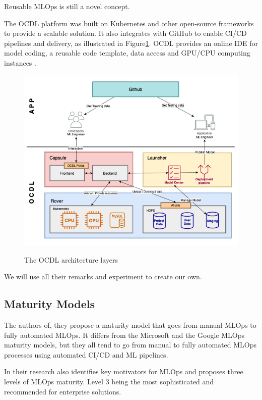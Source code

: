 Reusable MLOps is still a novel concept\cite{10690392}.

The OCDL platform\cite{LIU2020704} was built on Kubernetes and other open-source frameworks to provide a scalable solution.
It also integrates with GitHub to enable CI/CD pipelines and delivery, as illustrated in Figure\ref{fig:ocdl}.
OCDL provides an online IDE for model coding, a reusable code template, data access and GPU/CPU computing instances\cite{LIU2020704} .

\begin{figure}[!htbp]
    \caption{The OCDL architecture layers\cite{LIU2020704}}
    \centering
    \includegraphics[scale=0.5]{images/ocdl-architecture}
    \label{fig:ocdl}
\end{figure}

We will use all their remarks and experiment to create our own.



\subsection{Maturity Models}\label{subsec:matutiry-models}
The authors of\cite{mlops-maturity-model}, they propose a maturity model that goes from manual MLOps to fully automated MLOps.
It differs from the Microsoft and the Google MLOps maturity models,
but they all tend to go from manual to fully automated MLOps processes using automated CI/CD and
ML pipelines.\cite{mlops-definition-tools-and-challenge}

In their research\cite{inproceedings} also identifies key motivators for MLOps and proposes three levels of MLOps maturity.
Level 3 being the most sophisticated and recommended for enterprise solutions.

